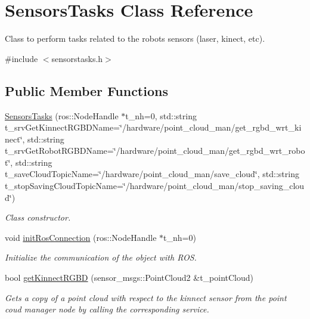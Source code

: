 \hypertarget{class_sensors_tasks}{}\section{Sensors\+Tasks Class Reference}
\label{class_sensors_tasks}


Class to perform tasks related to the robot\textquotesingle{}s sensors (laser, kinect, etc).  




{\ttfamily \#include $<$sensorstasks.\+h$>$}

\subsection*{Public Member Functions}
\begin{DoxyCompactItemize}
\item 
\hyperlink{class_sensors_tasks_a6b834b76394092b65ed959592ba0ab7c}{Sensors\+Tasks} (ros\+::\+Node\+Handle $\ast$t\+\_\+nh=0, std\+::string t\+\_\+srv\+Get\+Kinnect\+R\+G\+B\+D\+Name=\char`\"{}/hardware/point\+\_\+cloud\+\_\+man/get\+\_\+rgbd\+\_\+wrt\+\_\+kinect\char`\"{}, std\+::string t\+\_\+srv\+Get\+Robot\+R\+G\+B\+D\+Name=\char`\"{}/hardware/point\+\_\+cloud\+\_\+man/get\+\_\+rgbd\+\_\+wrt\+\_\+robot\char`\"{}, std\+::string t\+\_\+save\+Cloud\+Topic\+Name=\char`\"{}/hardware/point\+\_\+cloud\+\_\+man/save\+\_\+cloud\char`\"{}, std\+::string t\+\_\+stop\+Saving\+Cloud\+Topic\+Name=\char`\"{}/hardware/point\+\_\+cloud\+\_\+man/stop\+\_\+saving\+\_\+cloud\char`\"{})
\begin{DoxyCompactList}\small\item\em Class constructor. \end{DoxyCompactList}\item 
void \hyperlink{class_sensors_tasks_abc7b8d74392717156e78621e8741b231}{init\+Ros\+Connection} (ros\+::\+Node\+Handle $\ast$t\+\_\+nh=0)
\begin{DoxyCompactList}\small\item\em Initialize the communication of the object with R\+OS. \end{DoxyCompactList}\item 
bool \hyperlink{class_sensors_tasks_a8e366e9cb170c730304ea706a18370ce}{get\+Kinnect\+R\+G\+BD} (sensor\+\_\+msgs\+::\+Point\+Cloud2 \&t\+\_\+point\+Cloud)
\begin{DoxyCompactList}\small\item\em Gets a copy of a point cloud with respect to the kinnect sensor from the point coud manager node by calling the corresponding service. \end{DoxyCompactList}\item 

\end{DoxyCompactItemize}
